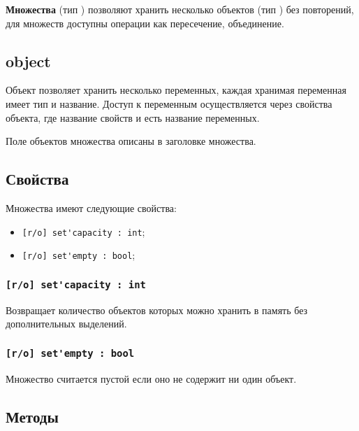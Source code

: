 \documentclass[a4paper, 14pt]{extarticle}
\newenvironment{icItems}
	{ \begin{itemize} [noitemsep,nolistsep] }
	{ \end{itemize} }
\begin{document}
{\bf Множества} (тип \set) позволяют хранить несколько объектов (тип \object) без повторений, для множеств доступны операции как пересечение, объединение.

\subsection{{\color{lightblue} object}}

Объект позволяет хранить несколько переменных, каждая хранимая переменная имеет тип и название. Доступ к переменным осуществляется через свойства объекта, где название свойств и есть название переменных.

Поле объектов множества описаны в заголовке множества.

\subsection{Свойства}

Множества имеют следующие свойства:
\begin{icItems}
\item \lstinline|[r/o] set'capacity : int|;
\item \lstinline|[r/o] set'empty : bool|;
\end{icItems}

\subsubsection{\lstinline|[r/o] set'capacity : int|}

Возвращает количество объектов которых можно хранить в память без дополнительных выделений.

\subsubsection{\lstinline|[r/o] set'empty : bool|}

Множество считается пустой если оно не содержит ни один объект.

\subsection{Методы}
\end{document}
